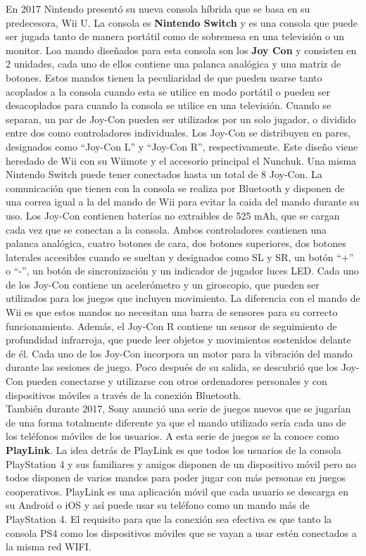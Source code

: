 En 2017 Nintendo present\'o su nueva consola h\'ibrida que se basa en su predecesora, Wii U. La consola es \textbf{Nintendo Switch} y es una consola que puede ser jugada tanto de manera port\'atil como de sobremesa en una televisi\'on o un monitor. Loa mando dise\~nados para esta consola son los \textbf{Joy Con} y consisten en 2 unidades, cada uno de ellos contiene una palanca anal\'ogica y una matriz de botones. Estos mandos tienen la peculiaridad de que pueden usarse tanto acoplados a la consola cuando esta se utilice en modo port\'atil o pueden ser desacoplados para cuando la consola se utilice en una televisi\'on. Cuando se separan, un par de Joy-Con pueden ser utilizados por un solo jugador, o dividido entre dos como controladores individuales. Los Joy-Con se distribuyen en pares, designados como ``Joy-Con L'' y ``Joy-Con R'', respectivamente. Este dise\~no viene heredado de Wii con su Wiimote y el accesorio principal el Nunchuk. Una misma Nintendo Switch puede tener conectados hasta un total de 8 Joy-Con. La comunicaci\'on que tienen con la consola se realiza por Bluetooth y disponen de una correa igual a la del mando de Wii para evitar la caida del mando durante su uso. Los Joy-Con contienen bater\'ias no extraibles de 525 mAh, que se cargan cada vez que se conectan a la consola. Ambos controladores contienen una palanca anal\'ogica, cuatro botones de cara, dos botones superiores, dos botones laterales accesibles cuando se sueltan y designados como SL y SR, un bot\'on ``+'' o ``-'', un bot\'on de sincronizaci\'on y un indicador de jugador luces LED. Cada uno de los Joy-Con contiene un aceler\'ometro y un giroscopio, que pueden ser utilizados para los juegos que incluyen movimiento. La diferencia con el mando de Wii es que estos mandos no necesitan una barra de sensores para su correcto funcionamiento. Adem\'as, el Joy-Con R contiene un sensor de seguimiento de profundidad infrarroja, que puede leer objetos y movimientos sostenidos delante de \'el. Cada uno de los Joy-Con incorpora un motor para la vibraci\'on del mando durante las sesiones de juego. Poco despu\'es de su salida, se descubri\'o que los Joy-Con pueden conectarse y utilizarse con otros ordenadores personales y con dispositivos m\'oviles a trav\'es de la conexi\'on Bluetooth.\\

Tambi\'en durante 2017, Sony anunci\'o una serie de juegos nuevos que se jugar\'ian de una forma totalmente diferente ya que el mando utilizado ser\'ia cada uno de los tel\'efonos m\'oviles de los usuarios. A esta serie de juegos se la conoce como \textbf{PlayLink}. La idea detr\'as de PlayLink es que todos los usuarios de la consola PlayStation 4 y sus familiares y amigos disponen de un dispositivo m\'ovil pero no todos disponen de varios mandos para poder jugar con m\'as personas en juegos cooperativos. PlayLink es una aplicaci\'on m\'ovil que cada usuario se descarga en su Android o iOS y as\'i puede usar su tel\'efono como un mando m\'as de PlayStation 4. El requisito para que la conexi\'on sea efectiva es que tanto la consola PS4 como los dispositivos m\'oviles que se vayan a usar est\'en conectados a la misma red WIFI.\\

